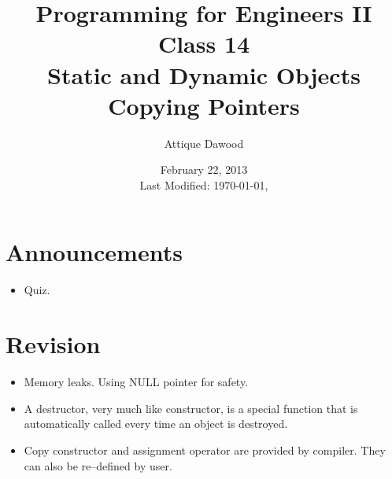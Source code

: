 \documentclass[12pt,a4paper]{article}
\title{\vspace{-2cm}Programming for Engineers II\\Class 14\\Static and Dynamic Objects\\Copying Pointers}
\author{Attique Dawood}
\date{February 22, 2013\\[0.2cm] Last Modified: \today, \currenttime}
\begin{document}
\maketitle
\section{Announcements}
\begin{itemize}
\item Quiz.
\end{itemize}
\section{Revision}
\begin{itemize}
\item Memory leaks. Using NULL pointer for safety.
\item A destructor, very much like constructor, is a special function that is automatically called every time an object is destroyed.
\item Copy constructor and assignment operator are provided by compiler. They can also be re--defined by user.
\end{itemize}
\end{document}
